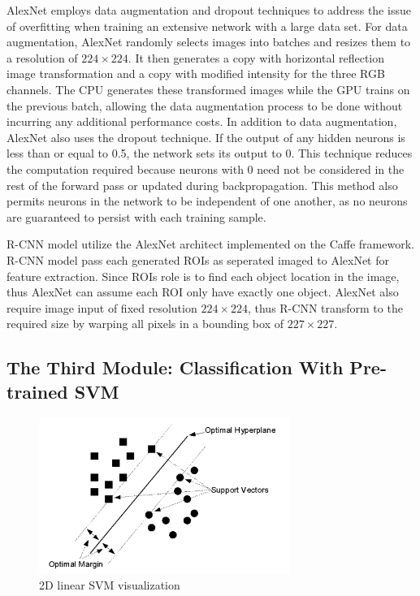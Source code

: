 AlexNet employs data augmentation and dropout techniques to address the issue of overfitting when training an extensive network with a large data set. For data augmentation, AlexNet randomly selects images into batches and resizes them to a resolution of $224 \times 224$. It then generates a copy with horizontal reflection image transformation and a copy with modified intensity for the three RGB channels. The CPU generates these transformed images while the GPU trains on the previous batch, allowing the data augmentation process to be done without incurring any additional performance costs. In addition to data augmentation, AlexNet also uses the dropout technique. If the output of any hidden neurons is less than or equal to 0.5, the network sets its output to 0. This technique reduces the computation required because neurons with 0 need not be considered in the rest of the forward pass or updated during backpropagation. This method also permits neurons in the network to be independent of one another, as no neurons are guaranteed to persist with each training sample.

R-CNN model utilize the AlexNet architect implemented on the Caffe framework. R-CNN model pass each generated ROIs as seperated imaged to AlexNet for feature extraction. Since ROIs role is to find each object location in the image, thus AlexNet can assume each ROI only have exactly one object. AlexNet also require image input of fixed resolution $224 \times 224$, thus R-CNN transform to the required size by warping all pixels in a bounding box of $227 \times 227$.

\subsection{The Third Module: Classification With Pre-trained SVM}

\begin{figure}[!ht]
    \centering
    \includegraphics[height=2in]{figures/2d_svm.png}
    \caption{2D linear SVM visualization \cite{2d_svm_Tzotsos}} \label{fig:2d_svm_viz}
\end{figure}

